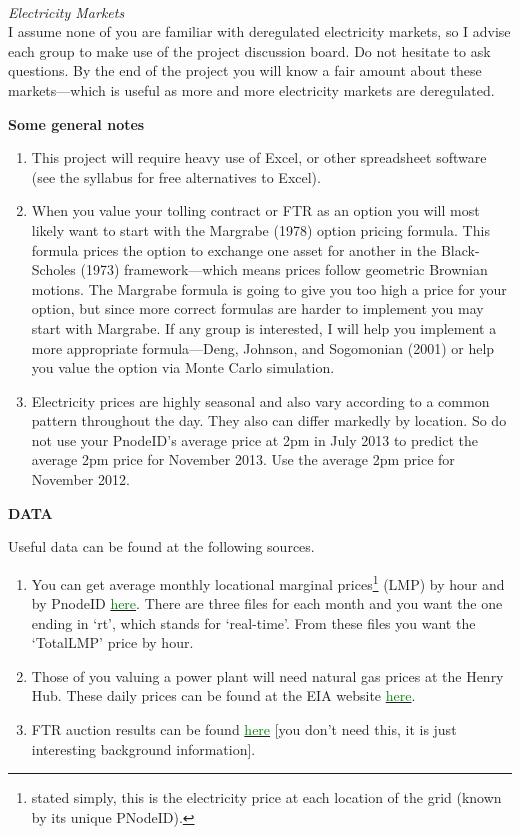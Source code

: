 \documentclass{article}
\begin{document}
\\
{\it Electricity Markets}\\
I assume none of you are familiar with deregulated electricity markets, so I advise each group to make use of the project discussion board.  Do not hesitate to ask questions.  By the end of the project you will know a fair amount about these markets---which is useful as more and more electricity markets are deregulated. 
\begin{center}
{\bf Some general notes}
\end{center}
\begin{enumerate}
\item This project will require heavy use of Excel, or other spreadsheet software (see the syllabus for free alternatives to Excel).  
\item When you value your tolling contract or FTR as an option you will most likely want to start with the Margrabe (1978) option pricing formula.  This formula prices the option to exchange one asset for another in the Black-Scholes (1973) framework---which means prices follow geometric Brownian motions.  The Margrabe formula is going to give you too high a price for your option, but since more correct formulas are harder to implement you may start with Margrabe.  If any group is interested, I will help you implement a more appropriate formula---Deng, Johnson, and Sogomonian (2001) or help you value the option via Monte Carlo simulation.
\item Electricity prices are highly seasonal and also vary according to a common pattern throughout the day.  They also can differ markedly by location.  So do not use your PnodeID's average price at 2pm in July 2013 to predict the average 2pm price for November 2013.  Use the average 2pm price for November 2012.
\end{enumerate}
\begin{center}
{\bf DATA}
\end{center}
Useful data can be found at the following sources.
\begin{enumerate}
\item You can get average monthly locational marginal prices\footnote{stated simply, this is the electricity price at each location of the grid (known by its unique PNodeID).} (LMP) by hour and by PnodeID \href{http://www.pjm.com/markets-and-operations/energy/real-time/monthlylmp.aspx}{\textcolor{green}{here}}.  There are three files for each month and you want the one ending in `rt', which stands for `real-time'. From these files you want the `TotalLMP' price by hour.
\item  Those of you valuing a power plant will need natural gas prices at the Henry Hub.  These daily prices can be found at the EIA website \href{http://www.eia.gov/dnav/ng/ng_pri_fut_s1_d.htm}{\textcolor{green}{here}}.
\item FTR auction results can be found \href{http://www.pjm.com/markets-and-operations/ftr/auction-user-info/historical-ftr-auction.aspx}{\textcolor{green}{here}} [you don't need this, it is just interesting background information].
\end{enumerate}
\end{document}
